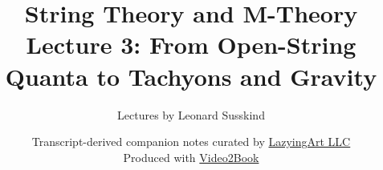 \documentclass[11pt,oneside]{book}
\begin{document}
\hypersetup{pageanchor=false}
\frontmatter
\title{String Theory and M-Theory\\[0.45em]
\large Lecture 3: From Open-String Quanta to Tachyons and Gravity}
\author{Lectures by Leonard Susskind}
\date{Transcript-derived companion notes curated by
\href{https://lazying.art}{LazyingArt LLC}\\[0.35em]
\small Produced with
\href{https://github.com/lachlanchen/Video2Book}{Video2Book}}
\maketitle
\hypersetup{pageanchor=true}
\mainmatter

\end{document}
